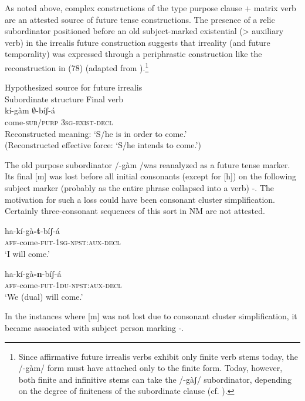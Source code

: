 \documentclass[output=paper]{langsci/langscibook}
\begin{document}
As noted above, complex constructions of the type purpose clause + matrix verb are an attested source of future tense constructions. The presence of a relic subordinator positioned before an old subject-marked existential ({>} auxiliary verb) in the irrealis future construction suggests that irreality (and future temporality) was expressed through a periphrastic construction like the reconstruction in (78) (adapted from \citealt[11]{Ahland2014b}).\footnote{Since affirmative future irrealis verbs exhibit only finite verb stems today, the /-gàm/ form must have attached only to the finite form. Today, however, both finite and infinitive stems can take the /-gàʃ/ subordinator, depending on the degree of finiteness of the subordinate clause (cf. \citealt[629]{Ahland2012}).}

\ea\label{ex:mahland:78}
Hypothesized source for future irrealis\\
Subordinate structure   Final verb\\
\gll  kí{}-gàm        ${\emptyset}${}-bíʃ-{\downstep}á\\
  come-\textsc{sub/purp}    \textsc{3sg-exist-decl} \\
  \glt Reconstructed meaning: `S/he is in order to come.'\\
  (Reconstructed effective force: `S/he intends to come.') 
  \z
  
  The old purpose subordinator /{}-gàm /was reanalyzed as a future tense marker. Its final [m] was lost before all initial consonants (except for [h]) on the following subject marker (probably as the entire phrase collapsed into a verb) -. The motivation for such a loss could have been consonant cluster simplification. Certainly three-consonant sequences of this sort in NM are not attested. 

\ea\label{ex:mahland:79}
\gll ha-kí-gà\textbf{{}-t}{}-bíʃ-á \\
\textsc{aff}{}-come-\textsc{fut-1sg-npst:aux-decl} \\
\glt `I will come.'
\z

\ea\label{ex:mahland:80}
\gll ha-kí-gà\textbf{{}-n}{}-bíʃ-á \\
\textsc{aff}{}-come-\textsc{fut-1du-npst:aux-decl} \\
\glt `We (dual) will come.'
\z

In the instances where [m] was not lost due to consonant cluster simplification, it became associated with subject person marking -.
\end{document}

